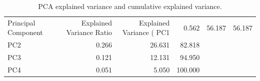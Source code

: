 \begin{table}
\centering
\caption{PCA explained variance and cumulative explained variance.}
\label{tab:pca_explained_variance}
\begin{tabular}{lrrr}
\toprule
Principal Component &  Explained Variance Ratio &  Explained Variance (%
\midrule
                PC1 &                     0.562 &                  56.187 &                   56.187 \\
                PC2 &                     0.266 &                  26.631 &                   82.818 \\
                PC3 &                     0.121 &                  12.131 &                   94.950 \\
                PC4 &                     0.051 &                   5.050 &                  100.000 \\
\bottomrule
\end{tabular}
\end{table}

